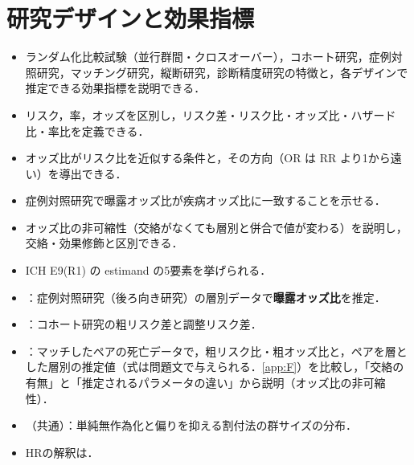 \chapter{研究デザインと効果指標}\label{ch:02}

\begin{goalbox}
\begin{itemize}
\item ランダム化比較試験（並行群間・クロスオーバー），コホート研究，症例対照研究，マッチング研究，縦断研究，診断精度研究の特徴と，各デザインで推定できる効果指標を説明できる．
\item リスク，率，オッズを区別し，リスク差・リスク比・オッズ比・ハザード比・率比を定義できる．
\item オッズ比がリスク比を近似する条件と，その方向（OR は RR より1から遠い）を導出できる．
\item 症例対照研究で曝露オッズ比が疾病オッズ比に一致することを示せる．
\item オッズ比の非可縮性（交絡がなくても層別と併合で値が変わる）を説明し，交絡・効果修飾と区別できる．
\item ICH E9(R1) の estimand の5要素を挙げられる．
\end{itemize}
\end{goalbox}

\begin{exambox}
\begin{itemize}
\item {}：症例対照研究（後ろ向き研究）の層別データで\textbf{曝露オッズ比}を推定．
\item {}：コホート研究の粗リスク差と調整リスク差．
\item {}：マッチしたペアの死亡データで，粗リスク比・粗オッズ比と，ペアを層とした層別の推定値（式は問題文で与えられる．\cref{app:F}）を比較し，「交絡の有無」と「推定されるパラメータの違い」から説明（オッズ比の非可縮性）．
\item {}（共通）：単純無作為化と偏りを抑える割付法の群サイズの分布．
\item HRの解釈は．
\end{itemize}
\end{exambox}

